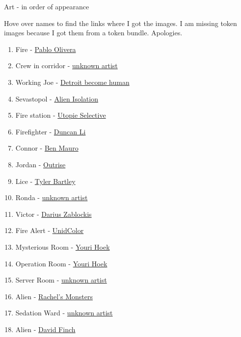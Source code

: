 \begin{rpg-commentbox}{Art - in order of appearance}

    Hove over names to find the links where I got the images. I am missing token images because I got them from a token bundle. Apologies.
    
    \begin{enumerate}
        \item Fire - \href{https://www.artstation.com/artwork/k4aZEK}{Pablo Olivera}
        \item Crew in corridor - \href{https://www.pinterest.co.kr/pin/676665912750875295/}{unknown artist}
        \item Working Joe - \href{https://www.creativeuncut.com/gallery-36/dbh-markus-concept3.html}{Detroit become human}
        \item Sevastopol - \href{https://www.pinterest.co.kr/pin/235031674292291532/}{Alien Isolation}
        \item Fire station - \href{https://www.artstation.com/artwork/qAolEy}{Utopie Selective}
        \item Firefighter - \href{https://www.artstation.com/artwork/xzEnRW}{Duncan Li}
        \item Connor - \href{https://kotaku.com/concept-art-from-that-incredible-space-whale-short-fi-1692510787}{ Ben Mauro}
        \item Jordan - \href{https://conceptartworld.com/news/outrise-game-concept-art/}{Outrise}
        \item Lice - \href{https://www.artstation.com/artwork/W2ld0D}{Tyler Bartley}
        \item Ronda - \href{https://www.pinterest.ca/pin/183099541089052369/}{unknown artist}
        \item Victor - \href{https://www.artstation.com/artwork/RnVXD}{Darius Zablockis}
        \item Fire Alert - \href{https://www.deviantart.com/unidcolor/art/Welcome-home-252052603}{UnidColor}
        \item Mysterious Room - \href{https://www.artstation.com/artwork/3odwVJ}{Youri Hoek}
        \item Operation Room - \href{https://north-of-normal-shadowrun-fargo.fandom.com/wiki/Red_Star}{Youri Hoek}
        \item Server Room - \href{http://red-tec.weebly.com/games-room.html}{unknown artist}
        \item Alien - \href{https://a-beast-blog.tumblr.com/post/159698121998/alien-warrior-i-drew-in-micron-pen-and-white}{Rachel's Monsters
        }
        \item Sedation Ward - \href{http://assignmentlist.blogspot.com/2013/09/interior-laboratory.html}{unknown artist}
        \item Alien - \href{https://twitter.com/coolcomicart/status/1278730200897839104}{David Finch}
        

\end{enumerate}
\end{rpg-commentbox}
